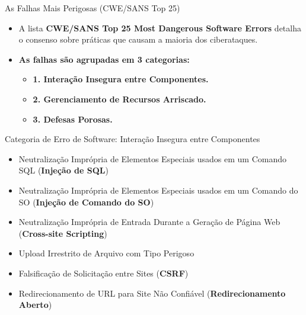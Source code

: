 \begin{frame}{As Falhas Mais Perigosas (CWE/SANS Top 25)}
    \begin{itemize}
        \item A lista \textbf{CWE/SANS Top 25 Most Dangerous Software Errors} detalha o consenso sobre práticas que causam a maioria dos ciberataques.

        \item \textbf{As falhas são agrupadas em 3 categorias:}
              \begin{itemize}
                  \item \textbf{1. Interação Insegura entre Componentes.}
                  \item \textbf{2. Gerenciamento de Recursos Arriscado.}
                  \item \textbf{3. Defesas Porosas.}
              \end{itemize}
    \end{itemize}
\end{frame}

\begin{frame}{Categoria de Erro de Software: Interação Insegura entre Componentes}
    \begin{itemize}
        \item Neutralização Imprópria de Elementos Especiais usados em um Comando SQL (\textbf{Injeção de SQL})
        \item Neutralização Imprópria de Elementos Especiais usados em um Comando do SO (\textbf{Injeção de Comando do SO})
        \item Neutralização Imprópria de Entrada Durante a Geração de Página Web (\textbf{Cross-site Scripting})
        \item Upload Irrestrito de Arquivo com Tipo Perigoso
        \item Falsificação de Solicitação entre Sites (\textbf{CSRF})
        \item Redirecionamento de URL para Site Não Confiável (\textbf{Redirecionamento Aberto})
    \end{itemize}
\end{frame}

